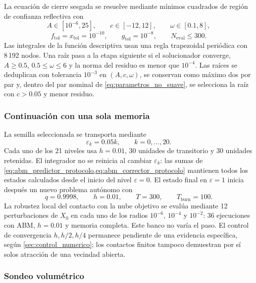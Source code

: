 La ecuación de cierre sesgada se resuelve mediante mínimos cuadrados de región
de confianza reflectiva con
\[
A\in[10^{-6},25],\qquad c\in[-12,12],\qquad
\omega\in[0.1,8],
\]
\[
f_{\mathrm{tol}}=x_{\mathrm{tol}}=10^{-10},\qquad
g_{\mathrm{tol}}=10^{-8},\qquad N_{\mathrm{eval}}\leq300.
\]
Las integrales de la función descriptiva usan una regla trapezoidal periódica
con 8\,192 nodos. Una raíz pasa a la etapa siguiente si el solucionador
converge, \(A\geq0.5\), \(0.5\leq\omega\leq6\) y la norma del residuo es menor
que \(10^{-4}\). Las raíces se deduplican con tolerancia \(10^{-3}\) en
\((A,c,\omega)\), se conservan como máximo dos por par y, dentro del par
nominal de \cref{eq:parametros_no_suave}, se selecciona la raíz con
\(c>0.05\) y menor residuo.

\subsubsection{Continuación con una sola memoria}

La semilla seleccionada se transporta mediante
\[
\varepsilon_k=0.05k,\qquad k=0,\ldots,20.
\]
Cada uno de los 21 niveles usa \(h=0.01\), 30 unidades de transitorio y 30
unidades retenidas. El integrador no se reinicia al cambiar
\(\varepsilon_k\): las sumas de
\cref{eq:abm_predictor_protocolo,eq:abm_corrector_protocolo} mantienen todos
los estados calculados desde el inicio del nivel \(\varepsilon=0\). El estado
final en \(\varepsilon=1\) inicia después un nuevo problema autónomo con
\[
q=0.9998,\qquad h=0.01,\qquad T=300,\qquad
T_{\mathrm{burn}}=100.
\]
La robustez local del contacto con la nube objetivo se evalúa mediante
12 perturbaciones de \(X_0\) en cada uno de los radios \(10^{-6}\),
\(10^{-4}\) y \(10^{-2}\): 36 ejecuciones con ABM, \(h=0.01\) y memoria
completa. Este banco no varía el paso. El control de convergencia
\(h,h/2,h/4\) permanece pendiente de una evidencia específica, según
\cref{sec:control_numerico}; los contactos finitos tampoco demuestran por sí
solos atracción de una vecindad abierta.

\subsubsection{Sondeo volumétrico}

